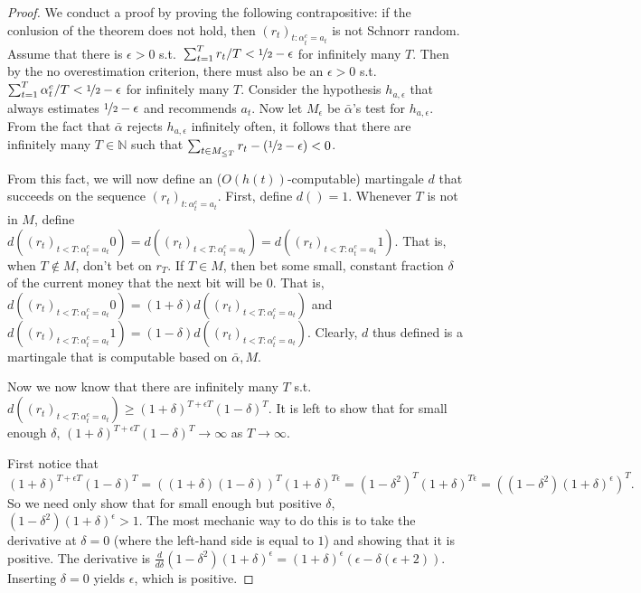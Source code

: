 \documentclass[submission,copyright,creativecommons]{eptcs}
\begin{document}
\begin{proof}
We conduct a proof by proving the following contrapositive: if the conlusion of the theorem does not hold, then $(r_t)_{t:\alpha_t^c=a_t}$ is not Schnorr random.
Assume that there is $\epsilon>0$ s.t.\ $\sum_{t=1}^T r_t/T<\nicefrac{1}{2}-\epsilon$ for infinitely many $T$. Then by the no overestimation criterion, there must also be an $\epsilon>0$ s.t.\ $\sum_{t=1}^T \alpha^e_t/T < \nicefrac{1}{2}-\epsilon$ for infinitely many $T$. Consider the hypothesis $h_{a,\epsilon}$ that always estimates $\nicefrac{1}{2}-\epsilon$ and recommends $a_t$. Now let $M_\epsilon$ be $\bar\alpha$'s test for $h_{a,\epsilon}$. From the fact that $\bar\alpha$ rejects $h_{a,\epsilon}$ infinitely often, it follows that there are infinitely many $T\in\mathbb{N}$ such that $\sum_{t\in M_{\leq T}} r_t - (\nicefrac{1}{2}-\epsilon) < 0$.

\begin{sloppypar}
From this fact, we will now define an ($O(h(t))$-computable) martingale $d$ that succeeds on the sequence $(r_t)_{t:\alpha_t^c=a_t}$. First, define $d()=1$. Whenever $T$ is not in $M$, define $d((r_t)_{t<T:\alpha_t^c=a_t}0)=d((r_t)_{t<T:\alpha_t^c=a_t})=d((r_t)_{t<T:\alpha_t^c=a_t}1)$. That is, when $T\notin M$, don't bet on $r_T$. If $T\in M$, then bet some small, constant fraction $\delta$ of the current money that the next bit will be $0$. That is, $d((r_t)_{t<T:\alpha_t^c=a_t}0)=(1+\delta)d((r_t)_{t<T:\alpha_t^c=a_t})$ and $d((r_t)_{t<T:\alpha_t^c=a_t}1)=(1-\delta)d((r_t)_{t<T:\alpha_t^c=a_t})$. Clearly, $d$ thus defined is a martingale that is computable based on $\bar\alpha,M$.
\end{sloppypar}

Now we now know that there are infinitely many $T$ s.t.\ $d((r_t)_{t<T:\alpha_t^c=a_t})\geq (1+\delta)^{T+\epsilon T}(1-\delta)^{T}$. It is left to show that for small enough $\delta$, $(1+\delta)^{T+\epsilon T}(1-\delta)^{T}\rightarrow \infty$ as $T\rightarrow \infty$.

First notice that
\begin{equation*}
    (1+\delta)^{T+\epsilon T}(1-\delta)^{T} = ((1+\delta)(1-\delta))^T (1+\delta)^{T\epsilon} = (1-\delta^2)^T (1+\delta)^{T\epsilon} = \left((1-\delta^2) (1+\delta)^{\epsilon}\right)^T.
\end{equation*}
So we need only show that for small enough but positive $\delta$, $(1-\delta^2) (1+\delta)^{\epsilon}>1$. The most mechanic way to do this is to take the derivative at $\delta=0$ (where the left-hand side is equal to $1$) and showing that it is positive. The derivative is $\frac{d}{d\delta} (1-\delta^2) (1+\delta)^{\epsilon} = (1+\delta)^\epsilon (\epsilon - \delta(\epsilon+2))$. Inserting $\delta=0$ yields $\epsilon$, which is positive.
\end{proof}
\end{document}
